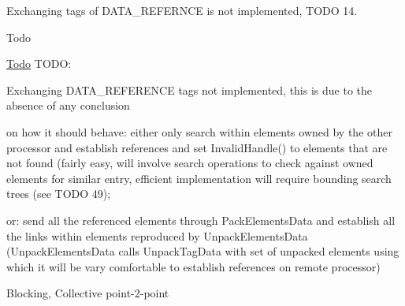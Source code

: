 Exchanging tags of D\-A\-T\-A\-\_\-\-R\-E\-F\-E\-R\-N\-C\-E is not implemented, T\-O\-D\-O 14. \begin{DoxyRefDesc}{Todo}
\item[\hyperlink{todo__todo000007}{Todo}]T\-O\-D\-O\-:
\begin{DoxyEnumerate}
\item Exchanging D\-A\-T\-A\-\_\-\-R\-E\-F\-E\-R\-E\-N\-C\-E tags not implemented, this is due to the absence of any conclusion
\end{DoxyEnumerate}
\begin{DoxyItemize}
\item on how it should behave\-: either only search within elements owned by the other processor and establish references and set Invalid\-Handle() to elements that are not found (fairly easy, will involve search operations to check against owned elements for similar entry, efficient implementation will require bounding search trees (see T\-O\-D\-O 49);
\item or\-: send all the referenced elements through Pack\-Elements\-Data and establish all the links within elements reproduced by Unpack\-Elements\-Data (Unpack\-Elements\-Data calls Unpack\-Tag\-Data with set of unpacked elements using which it will be vary comfortable to establish references on remote processor)
\end{DoxyItemize}\end{DoxyRefDesc}


Blocking, Collective point-\/2-\/point


